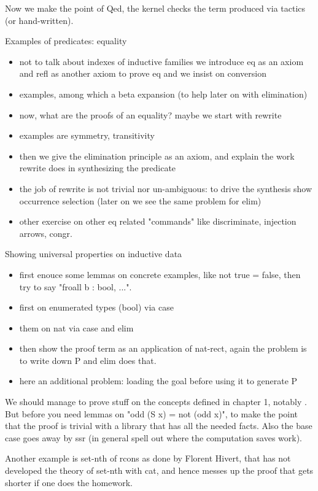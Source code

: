 Now we make the point of Qed, the kernel checks the term produced via
tactics (or hand-written).

Examples of predicates: equality
\begin{itemize}
\item not to talk about indexes of inductive families we introduce eq as
	an axiom and refl as another axiom to prove eq and we insist on
	conversion
\item examples, among which a beta expansion (to help later on with elimination)
\item now, what are the proofs of an equality? maybe we start with rewrite
\item examples are symmetry, transitivity
\item then we give the elimination principle as an axiom, and explain the
	work rewrite does in synthesizing the predicate
\item the job of rewrite is not trivial nor un-ambiguous: to drive the synthesis show occurrence selection (later on we see the same problem for elim)
\item other exercise on other eq related "commands" like discriminate, injection arrows, congr.
\end{itemize}

Showing universal properties on inductive data
\begin{itemize}
\item first enouce some lemmas on concrete examples, like not true = false,
	then try to say "froall b : bool, ...".
\item first on enumerated types (bool) via case
\item them on nat via case and elim
\item then show the proof term as an application of nat-rect, again the problem
	is to write down P and elim does that.
\item here an additional problem: loading the goal before using it to generate P
\end{itemize}

We should manage to prove stuff on the concepts defined in chapter 1,
notably .  But before you need lemmas
on "odd (S x) = not (odd x)", to make the point that the proof is trivial with
a library that has all the needed facts.  Also the base case goes away by ssr (in general spell out where the computation saves work).

Another example is set-nth of rcons as done by Florent Hivert, that has not
developed the theory of set-nth with cat, and hence messes up the proof
that gets shorter if one does the homework.

